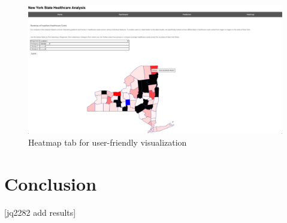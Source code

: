 \documentclass[10pt,twocolumn,letterpaper]{article}
\begin{document}
\begin{figure}
\includegraphics[scale=0.57]{heatmap.png}
\caption{Heatmap tab for user-friendly visualization}
\end{figure}

\section{Conclusion}

[jq2282 add results]


\end{document}
